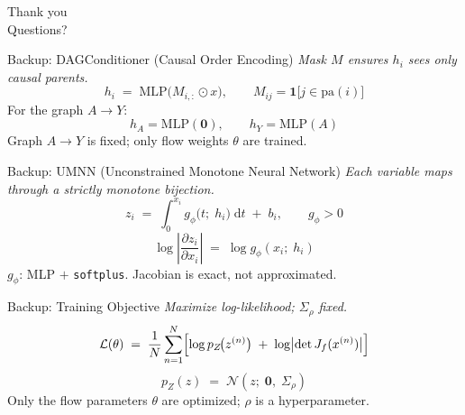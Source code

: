 \documentclass[10pt]{beamer}
\begin{document}
\begin{frame}
  \begin{center}
    \vspace{1.5cm}
    {\Huge Thank you}\\[1.5cm]
    {\Large Questions?}
  \end{center}
\end{frame}

\appendix

\begin{frame}{Backup: DAGConditioner (Causal Order Encoding)}
  \textit{Mask $M$ ensures $h_i$ sees only causal parents.}
  \[
    h_i \;=\; \mathrm{MLP}\!\bigl(M_{i,:} \odot x\bigr),
    \qquad M_{ij} = \mathbf{1}\bigl[j \in \mathrm{pa}(i)\bigr]
  \]
  For the graph $A \to Y$:
  \[
    h_A = \mathrm{MLP}(\mathbf{0}),
    \qquad
    h_Y = \mathrm{MLP}(A)
  \]
  Graph $A \to Y$ is fixed; only flow weights $\theta$ are trained.
\end{frame}

\begin{frame}{Backup: UMNN (Unconstrained Monotone Neural Network)}
  \textit{Each variable maps through a strictly monotone bijection.}
  \[
    z_i \;=\; \int_0^{x_i} g_\phi\!\bigl(t;\; h_i\bigr)\;\mathrm{d}t \;+\; b_i,
    \qquad g_\phi > 0
  \]
  \[
    \log\left|\frac{\partial z_i}{\partial x_i}\right|
    \;=\; \log g_\phi(x_i;\; h_i)
  \]
  $g_\phi$: MLP $+$ \texttt{softplus}. Jacobian is exact, not approximated.
\end{frame}

\begin{frame}{Backup: Training Objective}
  \textit{Maximize log-likelihood; $\Sigma_\rho$ fixed.}
  \[
    \mathcal{L}(\theta)
    \;=\; \frac{1}{N}\sum_{n=1}^N
    \Bigl[
      \log p_Z\!\bigl(z^{(n)}\bigr)
      \;+\;
      \log\bigl|\det J_f(x^{(n)})\bigr|
    \Bigr]
  \]
  \[
    p_Z(z) \;=\; \mathcal{N}(z;\;\mathbf{0},\;\Sigma_\rho)
  \]
  Only the flow parameters $\theta$ are optimized; $\rho$ is a hyperparameter.
\end{frame}
\end{document}
